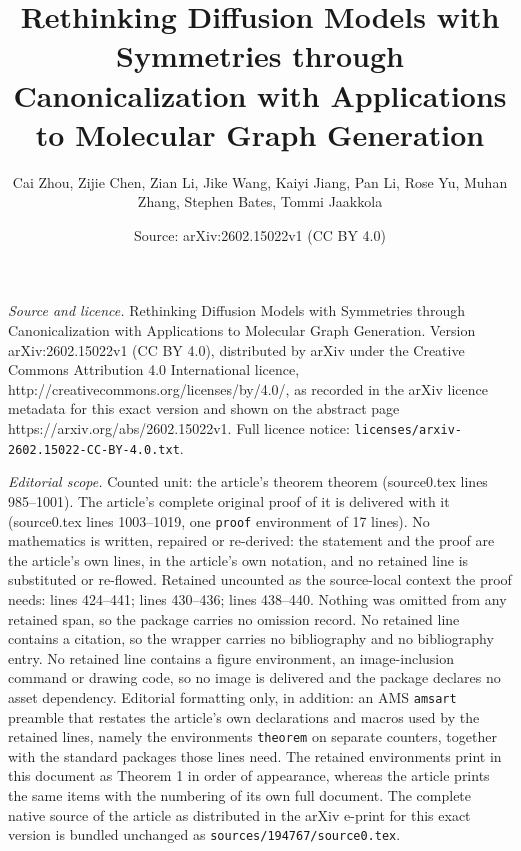 \documentclass[10pt,a4paper]{amsart}
\title{Rethinking Diffusion Models with Symmetries through Canonicalization with Applications to Molecular Graph Generation}
\author{Cai Zhou, Zijie Chen, Zian Li, Jike Wang, Kaiyi Jiang, Pan Li, Rose Yu, Muhan Zhang, Stephen Bates, Tommi Jaakkola}
\date{Source: arXiv:2602.15022v1 (CC BY 4.0)}
\begin{document}
\maketitle

\noindent\emph{Source and licence.} Rethinking Diffusion Models with Symmetries through Canonicalization with Applications to Molecular Graph Generation. Version arXiv:2602.15022v1 (CC BY 4.0), distributed by arXiv under the Creative Commons Attribution 4.0 International licence, http://creativecommons.org/licenses/by/4.0/, as recorded in the arXiv licence metadata for this exact version and shown on the abstract page https://arxiv.org/abs/2602.15022v1. Full licence notice: \texttt{licenses/arxiv-2602.15022-CC-BY-4.0.txt}.\par\smallskip

\noindent\textit{Editorial scope.} Counted unit: the article's theorem theorem (source0.tex lines 985--1001). The article's complete original proof of it is delivered with it (source0.tex lines 1003--1019, one \texttt{proof} environment of 17 lines). No mathematics is written, repaired or re-derived: the statement and the proof are the article's own lines, in the article's own notation, and no retained line is substituted or re-flowed.  Retained uncounted as the source-local context the proof needs: lines 424--441; lines 430--436; lines 438--440.  Nothing was omitted from any retained span, so the package carries no omission record.  No retained line contains a citation, so the wrapper carries no bibliography and no bibliography entry.  No retained line contains a figure environment, an image-inclusion command or drawing code, so no image is delivered and the package declares no asset dependency.  Editorial formatting only, in addition: an AMS \texttt{amsart} preamble that restates the article's own declarations and macros used by the retained lines, namely the environments \texttt{theorem} on separate counters, together with the standard packages those lines need.  The retained environments print in this document as Theorem 1 in order of appearance, whereas the article prints the same items with the numbering of its own full document.  The complete native source of the article as distributed in the arXiv e-print for this exact version is bundled unchanged as \texttt{sources/194767/source0.tex}.
\end{document}
